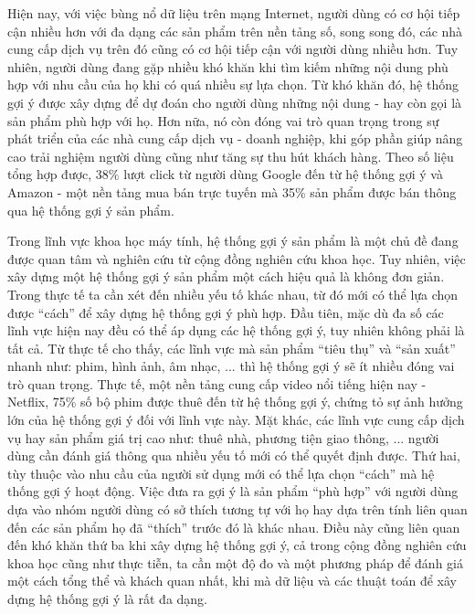 


Hiện nay, với việc bùng nổ dữ liệu trên mạng Internet, người dùng có cơ hội tiếp cận
nhiều hơn với đa dạng các sản phẩm trên nền tảng số, song song đó,
các nhà cung cấp dịch vụ trên đó cũng có cơ hội tiếp cận với người dùng nhiều hơn. %
Tuy nhiên, người dùng đang gặp nhiều khó khăn khi tìm kiếm những nội dung phù hợp với nhu cầu của họ khi có quá nhiều sự lựa chọn.
Từ khó khăn đó, hệ thống gợi ý được xây dựng để dự đoán cho người dùng những nội dung - hay còn gọi là sản phẩm phù hợp với họ.
Hơn nữa, nó còn đóng vai trò quan trọng trong sự phát triển của các nhà cung cấp dịch vụ - doanh nghiệp,
khi góp phần giúp nâng cao trải nghiệm người dùng cũng như tăng sự thu hút khách hàng. Theo số liệu tổng hợp được, 
38\% lượt click từ người dùng Google đến từ hệ thống gợi ý và 
Amazon - một nền tảng mua bán trực tuyến mà 35\% sản phẩm được bán thông qua hệ thống gợi ý sản phẩm.

Trong lĩnh vực khoa học máy tính, hệ thống gợi ý sản phẩm là một chủ đề 
đang được quan tâm và nghiên cứu từ cộng đồng nghiên cứu khoa học.
Tuy nhiên, việc xây dựng một hệ thống gợi ý sản phẩm một cách hiệu quả là không đơn giản.
Trong thực tế ta cần xét đến nhiều yếu tố khác nhau, 
từ đó mới có thể lựa chọn được ``cách'' để xây dựng hệ thống gợi ý phù hợp. %
Đầu tiên, mặc dù đa số các lĩnh vực hiện nay đều có thể áp dụng các hệ thống gợi ý, tuy nhiên không phải là tất cả.
Từ thực tế cho thấy, các lĩnh vực mà sản phẩm ``tiêu thụ'' và ``sản xuất'' nhanh như: phim, hình ảnh, âm nhạc, ... 
thì hệ thống gợi ý sẽ ít nhiều đóng vai trò quan trọng. 
Thực tế, một nền tảng cung cấp video nổi tiếng hiện nay - Netflix,
75\% số bộ phim được thuê đến từ hệ thống gợi ý, chứng tỏ sự ảnh hưởng lớn của hệ thống gợi ý đối với lĩnh vực này. 
Mặt khác, các lĩnh vực cung cấp dịch vụ hay sản phẩm giá trị cao như:
thuê nhà, phương tiện giao thông, ... người dùng cần đánh giá thông qua nhiều yếu tố mới có thể quyết định được. 
Thứ hai, tùy thuộc vào nhu cầu của người sử dụng mới có thể lựa chọn ``cách'' mà hệ thống gợi ý hoạt động.
Việc đưa ra gợi ý là sản phẩm ``phù hợp'' với người dùng dựa vào nhóm người dùng có sở thích tương tự với họ 
hay dựa trên tính liên quan đến các sản phẩm họ đã ``thích'' trước đó là khác nhau. 
Điều này cũng liên quan đến khó khăn thứ ba khi xây dựng hệ thống gợi ý, cả trong cộng đồng nghiên cứu khoa học cũng như thực tiễn, 
ta cần một độ đo và một phương pháp để đánh giá một cách tổng thể và khách quan nhất, 
khi mà dữ liệu và các thuật toán để xây dựng hệ thống gợi ý là rất đa dạng.

